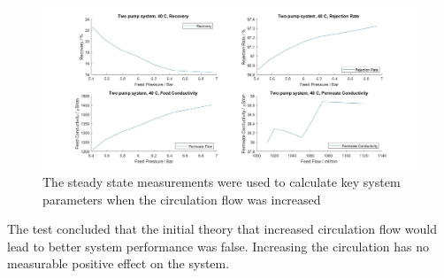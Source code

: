 \begin{figure}[H]
    \centering
    \includegraphics[width=1.1\textwidth]{RecIncrease40Key}
    \caption{The steady state measurements were used to calculate key system parameters when the circulation flow was increased}
    \label{fig:RecIncreaseKey40}
\end{figure} 
\par\bigskip 
\noindent
The test concluded that the initial theory that increased circulation flow would lead to better system performance was false. Increasing the circulation has no measurable positive effect on the system. \\
\\
\newpage
